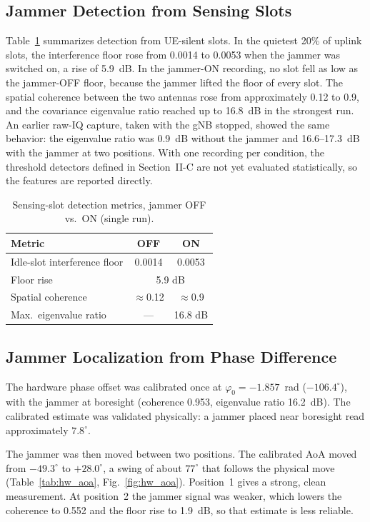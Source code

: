 \documentclass[conference]{IEEEtran}
\begin{document}
\subsection{Jammer Detection from Sensing Slots}

Table~\ref{tab:hw_detect} summarizes detection from UE-silent slots. In the
quietest 20\% of uplink slots, the interference floor rose from 0.0014 to
0.0053 when the jammer was switched on, a rise of 5.9~dB. In the jammer-ON recording, no slot fell as low as the jammer-OFF floor,
because the jammer lifted the floor of every slot. The spatial coherence between the two antennas rose from
approximately 0.12 to 0.9, and the covariance eigenvalue ratio reached up to
16.8~dB in the strongest run. An earlier raw-IQ capture, taken with the gNB
stopped, showed the same behavior: the eigenvalue ratio was 0.9~dB without the
jammer and 16.6--17.3~dB with the jammer at two positions. With one recording per condition, the threshold detectors defined in Section~II-C are not yet evaluated statistically, so the features are reported
directly.

\begin{table}[htbp]
\centering
\caption{Sensing-slot detection metrics, jammer OFF vs.\ ON (single run).}
\label{tab:hw_detect}
\begin{tabular}{l c c}
\hline
\textbf{Metric} & \textbf{OFF} & \textbf{ON} \\
\hline
Idle-slot interference floor & 0.0014 & 0.0053 \\
Floor rise & \multicolumn{2}{c}{5.9 dB} \\
Spatial coherence & $\approx$0.12 & $\approx$0.9 \\
Max.\ eigenvalue ratio & --- & 16.8 dB \\
\hline
\end{tabular}
\end{table}

\subsection{Jammer Localization from Phase Difference}

The hardware phase offset was calibrated once at $\varphi_0=-1.857$~rad
($-106.4^\circ$), with the jammer at boresight (coherence 0.953, eigenvalue
ratio 16.2~dB). The calibrated estimate was validated physically: a jammer
placed near boresight read approximately $7.8^\circ$.

The jammer was then moved between two positions. The calibrated AoA moved from
$-49.3^\circ$ to $+28.0^\circ$, a swing of about $77^\circ$ that follows the
physical move (Table~\ref{tab:hw_aoa}, Fig.~\ref{fig:hw_aoa}). Position~1 gives
a strong, clean measurement. At position~2 the jammer signal was weaker, which
lowers the coherence to 0.552 and the floor rise to 1.9~dB, so that estimate is
less reliable.
\end{document}
